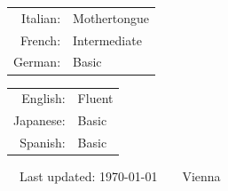 \documentclass[11pt]{article} %
\begin{document}
\begin{minipage}[t]{.45\textwidth}
\begin{tabular}{rl}
Italian: & Mothertongue\\
French: & Intermediate\\
German: & Basic\\
\end{tabular}
\end{minipage}%
\begin{minipage}[t]{.45\textwidth}
\begin{tabular}{rl}
English: & Fluent\\
Japanese: & Basic\\
Spanish: & Basic\\
\end{tabular}
\end{minipage}


\begin{center}
	\scriptsize
	\raisebox{-0.5pt}{\textbullet}~~Last updated: \today~~\raisebox{-0.5pt}{\textbullet}~~Vienna~~\raisebox{-0.5pt}{\textbullet}
\end{center}
\end{document}
